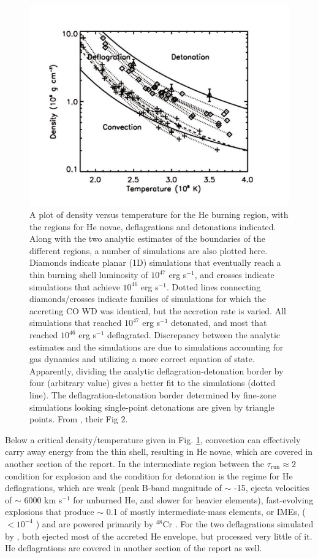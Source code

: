 \begin{figure}
\centerline{\includegraphics[width=1.0\hsize]{woosleyfig.pdf}}
\caption{A plot of density versus temperature for the He burning region, with the regions for He novae, deflagrations and detonations indicated.  Along with the two analytic estimates of the boundaries of the different regions, a number of simulations are also plotted here.  Diamonds indicate planar (1D) simulations that eventually reach a thin burning shell luminosity of $10^{47}$ erg s$^{-1}$, and crosses indicate simulations that achieve $10^{46}$ erg s$^{-1}$.  Dotted lines connecting diamonds/crosses indicate families of simulations for which the accreting CO WD was identical, but the accretion rate is varied.  All simulations that reached $10^{47}$ erg s$^{-1}$ detonated, and most that reached $10^{46}$ erg s$^{-1}$ deflagrated.  Discrepancy between the analytic estimates and the simulations are due to simulations accounting for gas dynamics and utilizing a more correct equation of state.  Apparently, dividing the analytic deflagration-detonation border by four (arbitrary value) gives a better fit to the simulations (dotted line).  The deflagration-detonation border determined by fine-zone simulations looking single-point detonations are given by triangle points.  From \cite{woosk10}, their Fig 2.}
\label{woosleyfig}
\end{figure}

Below a critical density/temperature given in Fig. \ref{woosleyfig}, convection can effectively carry away energy from the thin shell, resulting in He novae, which are covered in another section of the report.  In the intermediate region between the $\tau_{\mathrm{run}} \approx 2$ condition for explosion and the condition for detonation is the regime for He deflagrations, which are weak (peak B-band magnitude of $\sim$ -15, ejecta velocities of $\sim$ 6000 km s$^{-1}$ for unburned He, and slower for heavier elements), fast-evolving explosions that produce $\sim$ 0.1 {\Msun} of mostly intermediate-mass elements, or IMEs, ($< 10^{-4}$ {\Msun} {\Ni}) and are powered primarily by $^{48}$Cr \citep{woosk10}.  For the two deflagrations simulated by \citeauthor{woosk10}, both ejected most of the accreted He envelope, but processed very little of it.  He deflagrations are covered in another section of the report as well.

